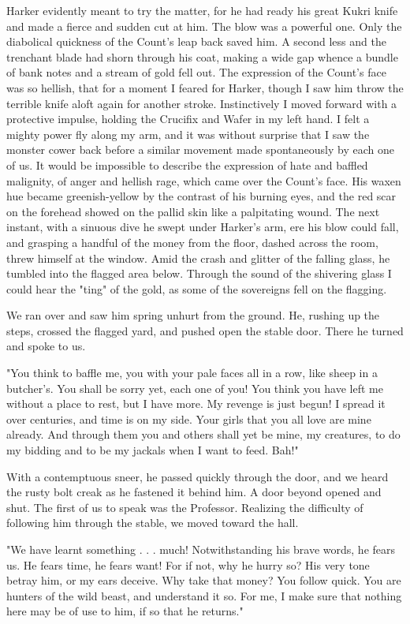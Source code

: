 Harker evidently meant to try the matter, for he had ready his great Kukri knife and made a fierce and sudden cut at him. The blow was a powerful one. Only the diabolical quickness of the Count's leap back saved him. A second less and the trenchant blade had shorn through his coat, making a wide gap whence a bundle of bank notes and a stream of gold fell out. The expression of the Count's face was so hellish, that for a moment I feared for Harker, though I saw him throw the terrible knife aloft again for another stroke. Instinctively I moved forward with a protective impulse, holding the Crucifix and Wafer in my left hand. I felt a mighty power fly along my arm, and it was without surprise that I saw the monster cower back before a similar movement made spontaneously by each one of us. It would be impossible to describe the expression of hate and baffled malignity, of anger and hellish rage, which came over the Count's face. His waxen hue became greenish-yellow by the contrast of his burning eyes, and the red scar on the forehead showed on the pallid skin like a palpitating wound. The next instant, with a sinuous dive he swept under Harker's arm, ere his blow could fall, and grasping a handful of the money from the floor, dashed across the room, threw himself at the window. Amid the crash and glitter of the falling glass, he tumbled into the flagged area below. Through the sound of the shivering glass I could hear the "ting" of the gold, as some of the sovereigns fell on the flagging. 

We ran over and saw him spring unhurt from the ground. He, rushing up the steps, crossed the flagged yard, and pushed open the stable door. There he turned and spoke to us. 

"You think to baffle me, you with your pale faces all in a row, like sheep in a butcher's. You shall be sorry yet, each one of you! You think you have left me without a place to rest, but I have more. My revenge is just begun! I spread it over centuries, and time is on my side. Your girls that you all love are mine already. And through them you and others shall yet be mine, my creatures, to do my bidding and to be my jackals when I want to feed. Bah!" 

With a contemptuous sneer, he passed quickly through the door, and we heard the rusty bolt creak as he fastened it behind him. A door beyond opened and shut. The first of us to speak was the Professor. Realizing the difficulty of following him through the stable, we moved toward the hall. 

"We have learnt something . . . much! Notwithstanding his brave words, he fears us. He fears time, he fears want! For if not, why he hurry so? His very tone betray him, or my ears deceive. Why take that money? You follow quick. You are hunters of the wild beast, and understand it so. For me, I make sure that nothing here may be of use to him, if so that he returns." 

